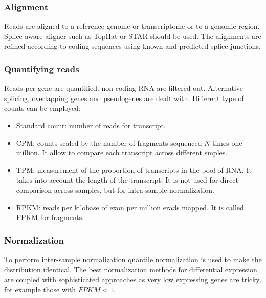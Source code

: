 		\subsubsection{Alignment}
		Reads are aligned to a reference genome or transcriptome or to a genomic region.
		Splice-aware aligner such as TopHat or STAR should be used.
		The alignments are refined according to coding sequences using known and predicted splice junctions.

		\subsubsection{Quantifying reads}
		Reads per gene are quantified.
		non-coding RNA are filtered out.
		Alternative splicing, overlapping genes and pseudogenes are dealt with.
		Different type of counts can be employed:

		\begin{multicols}{2}
			\begin{itemize}
				\item Standard count: number of reads for transcript.
				\item CPM: counts scaled by the number of fragments sequenced $N$ times one million.
					It allow to compare each transcript across different smples.
				\item TPM: measurement of the proportion of transcripts in the pool of RNA.
					It takes into account the length of the transcript.
					It is not used for direct comparison across samples, but for intra-sample normalization.
				\item RPKM: reads per kilobase of exon per million erads mapped.
					It is called FPKM for fragments.
			\end{itemize}
		\end{multicols}

		\subsubsection{Normalization}
		To perform inter-sample normalization quantile normalization is used to make the distribution identical.
		The best normalization methods for differential expression are coupled with sophisticated approaches as very low expressing genes are tricky, for example those with $FPKM<1$.
